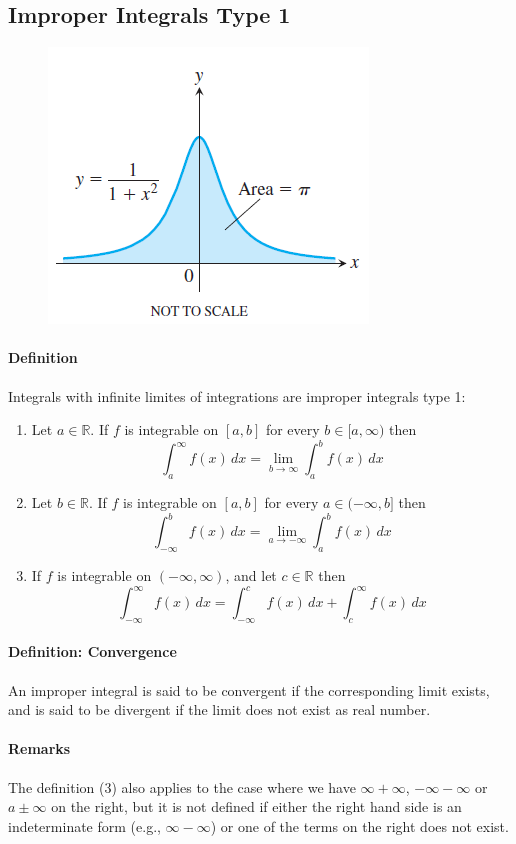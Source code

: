 \documentclass[12pt]{article}
\begin{document}
\subsection{Improper Integrals Type 1}
\begin{figure}[H]
     \centering
     \includegraphics[width = 0.5\linewidth]{Images/improper type 1.png}
\end{figure}
\paragraph{Definition} Integrals with infinite limites of integrations are improper integrals type 1:
\begin{enumerate} 
     \item Let $a \in \mathbb{R}$. If $f$ is integrable on $[a, b]$ for every $b \in [a, \infty)$ then 
     \[
         \int_a^{\infty} f(x) \, dx = \lim_{b \to \infty} \int_a^b f(x) \, dx
     \]
     \item Let $b \in \mathbb{R}$. If $f$ is integrable on $[a, b]$ for every $a \in (-\infty, b]$ then 
     \[
         \int_{ -\infty}^{b} f(x) \, dx = \lim_{a \to - \infty} \int_a^b f(x) \, dx
     \]
     \item If $f$ is integrable on $(- \infty, \infty)$, and let $c \in \mathbb{R}$ then
     \[
        \int_{ -\infty}^{\infty } f(x) \, dx = \int_{ -\infty}^{c} f(x) \, dx + \int_{c}^{\infty } f(x) \, dx
     \]
\end{enumerate}

\paragraph{Definition: Convergence} An improper integral is said to be convergent if the corresponding limit exists, and is said to be divergent if the limit does not exist as real number.

\paragraph{Remarks} The definition (3) also applies to the case where we have $\infty + \infty$, $-\infty - \infty$ or $a \pm \infty$ on the right, but it is not defined if either 
the right hand side is an indeterminate form (e.g., $\infty - \infty$) or one of the terms on the right does not exist. \\
\end{document}

